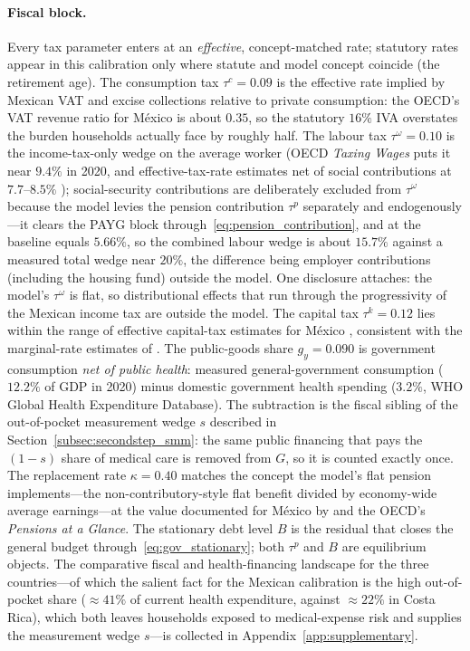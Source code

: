 \documentclass[12pt,a4paper]{article}
\begin{document}
\paragraph{Fiscal block.}
Every tax parameter enters at an \emph{effective}, concept-matched rate; statutory rates appear in this calibration only where statute and model concept coincide (the retirement age). The consumption tax $\tau^c=0.09$ is the effective rate implied by Mexican VAT and excise collections relative to private consumption: the OECD's VAT revenue ratio for M\'exico is about $0.35$, so the statutory $16\%$ IVA overstates the burden households actually face by roughly half. The labour tax $\tau^\omega=0.10$ is the income-tax-only wedge on the average worker (OECD \emph{Taxing Wages} puts it near $9.4\%$ in 2020, and effective-tax-rate estimates net of social contributions at $7.7$--$8.5\%$ \citep{BachasFisherPostJensenZucman2022}); social-security contributions are deliberately excluded from $\tau^\omega$ because the model levies the pension contribution $\tau^p$ separately and endogenously---it clears the PAYG block through~\eqref{eq:pension_contribution}, and at the baseline equals $5.66\%$, so the combined labour wedge is about $15.7\%$ against a measured total wedge near $20\%$, the difference being employer contributions (including the housing fund) outside the model. One disclosure attaches: the model's $\tau^\omega$ is flat, so distributional effects that run through the progressivity of the Mexican income tax are outside the model. The capital tax $\tau^k=0.12$ lies within the range of effective capital-tax estimates for M\'exico \citep[$0.108$--$0.121$;][]{BachasFisherPostJensenZucman2022}, consistent with the marginal-rate estimates of \citet{Anton2005}. The public-goods share $g_y=0.090$ is government consumption \emph{net of public health}: measured general-government consumption ($12.2\%$ of GDP in 2020) minus domestic government health spending ($3.2\%$, WHO Global Health Expenditure Database). The subtraction is the fiscal sibling of the out-of-pocket measurement wedge $s$ described in Section~\ref{subsec:secondstep_smm}: the same public financing that pays the $(1-s)$ share of medical care is removed from $G$, so it is counted exactly once. The replacement rate $\kappa=0.40$ matches the concept the model's flat pension implements---the non-contributory-style flat benefit divided by economy-wide average earnings---at the value documented for M\'exico by \citet{Bonthuis2024} and the OECD's \emph{Pensions at a Glance}. The stationary debt level $B$ is the residual that closes the general budget through~\eqref{eq:gov_stationary}; both $\tau^p$ and $B$ are equilibrium objects. The comparative fiscal and health-financing landscape for the three countries---of which the salient fact for the Mexican calibration is the high out-of-pocket share ($\approx 41\%$ of current health expenditure, against $\approx 22\%$ in Costa Rica), which both leaves households exposed to medical-expense risk and supplies the measurement wedge $s$---is collected in Appendix~\ref{app:supplementary}.
\end{document}
